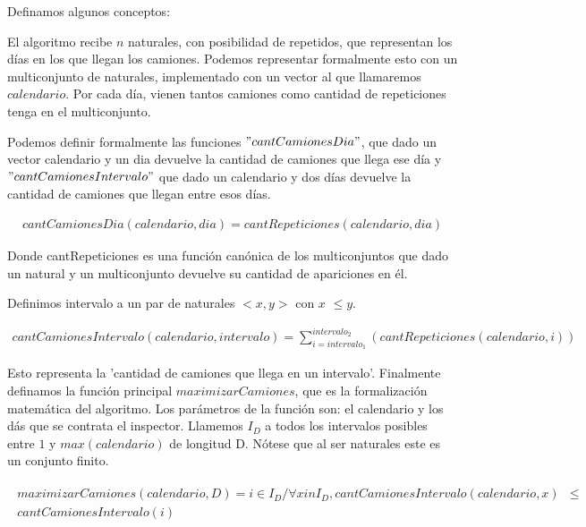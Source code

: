 Definamos algunos conceptos:

\vspace{2mm}

El algoritmo recibe $n$ naturales, con posibilidad de repetidos, que representan los d\'ias en los que llegan los camiones. Podemos representar formalmente esto con un multiconjunto de naturales, implementado con un vector al que llamaremos $calendario$. Por cada d\'ia, vienen tantos camiones como cantidad de repeticiones tenga en el multiconjunto.

\vspace{2mm}

Podemos definir formalmente las funciones $"cantCamionesDia"$, que dado un vector calendario y un dia devuelve la cantidad de camiones que llega ese d\'ia y $"cantCamionesIntervalo"$ que dado un calendario y dos d\'ias devuelve la cantidad de camiones que llegan entre esos d\'ias.

\begin{align*}
cantCamionesDia(calendario, dia) = cantRepeticiones(calendario, dia) 
\end{align*}

Donde cantRepeticiones es una funci\'on can\'onica de los multiconjuntos que dado un natural y un multiconjunto devuelve su cantidad de apariciones en \'el.

\vspace{2mm}

Definimos intervalo a un par de naturales $<x,y>$ con $x$ $\leq y$.

\begin{align*}
cantCamionesIntervalo(calendario, intervalo) = \sum_{i=intervalo_1}^{intervalo_2}( cantRepeticiones(calendario, i) ) 
\end{align*}

Esto representa la 'cantidad de camiones que llega en un intervalo'. Finalmente definamos la funci\'on principal $maximizarCamiones$, que es la formalizaci\'on matem\'atica del algoritmo. Los par\'ametros de la funci\'on son: el calendario y los d\'as que se contrata el inspector. Llamemos $I_D$ a todos los intervalos posibles entre $1$ y $max(calendario)$ de longitud D. N\'otese que al ser naturales este es un conjunto finito.

\begin{align*}
\begin{split}
maximizarCamiones(calendario, D)  =  i \in I_D / \forall x in I_D, cantCamionesIntervalo(calendario,x)& \leq  \\ cantCamionesIntervalo(i)
\end{split}
\end{align*}

